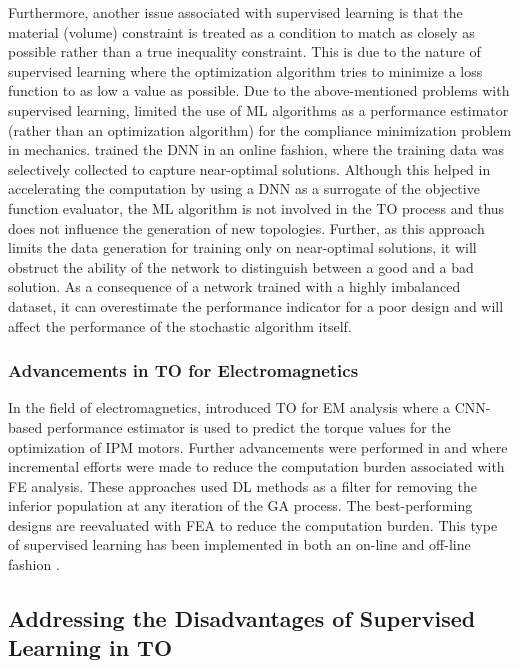 Furthermore, another issue associated with supervised learning is that the material (volume) constraint is treated as a condition to match as closely as possible rather than a true inequality constraint. This is due to the nature of supervised learning where the optimization algorithm tries to minimize a loss function to as low a value as possible. Due to the above-mentioned problems with supervised learning, \cite{deng2020deep} limited the use of ML algorithms as a performance estimator (rather than an optimization algorithm) for the compliance minimization problem in mechanics. \cite{deng2020deep} trained the DNN in an online fashion, where the training data was selectively collected to capture near-optimal solutions. Although this helped in accelerating the computation by using a DNN as a surrogate of the objective function evaluator, the ML algorithm is not involved in the TO process and thus does not influence the generation of new topologies. Further, as this approach limits the data generation for training only on near-optimal solutions, it will obstruct the ability of the network to distinguish between a good and a bad solution. As a consequence of a network trained with a highly imbalanced dataset, it can overestimate the performance indicator for a poor design and will affect the performance of the stochastic algorithm itself.

\subsubsection{Advancements in TO for Electromagnetics}
In the field of electromagnetics, \cite{sasaki2019topology} introduced TO for EM analysis where a CNN-based performance estimator is used to predict the torque values for the optimization of IPM motors. Further advancements were performed in \cite{doi2019multi} and \cite{barmada2020deep} where incremental efforts were made to reduce the computation burden associated with FE analysis. These approaches used DL methods as a filter for removing the inferior population at any iteration of the GA process. The best-performing designs are reevaluated with FEA to reduce the computation burden. This type of supervised learning has been implemented in both an on-line \parencite{doi2019multi} and off-line fashion \parencite{sasaki2019topology}. 

\subsection{Addressing the Disadvantages of Supervised Learning in TO}

